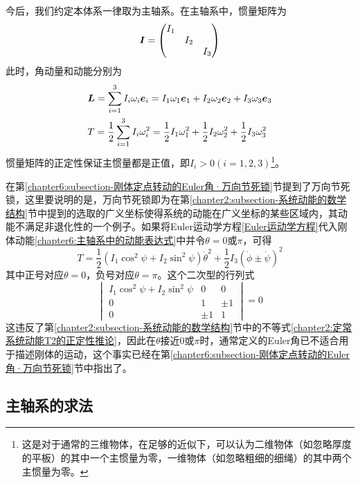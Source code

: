 今后，我们约定本体系一律取为主轴系。在主轴系中，惯量矩阵为
\begin{equation*}
	\boldsymbol{I} = \begin{pmatrix} I_1 & & \\ & I_2 & \\ & & I_3 \end{pmatrix}
\end{equation*}
此时，角动量和动能分别为
\begin{align}
	& \boldsymbol{L} = \sum_{i=1}^3 I_i \omega_i \boldsymbol{e}_i = I_1\omega_1\boldsymbol{e}_1+I_2\omega_2\boldsymbol{e}_2+I_3\omega_3\boldsymbol{e}_3 \label{chapter6:主轴系中的角动量表达式} \\
	& T = \frac12 \sum_{i=1}^3 I_i \omega_i^2 = \frac12 I_1\omega_1^2+\frac12 I_2\omega_2^2+\frac12 I_3\omega_3^2 \label{chapter6:主轴系中的动能表达式}
\end{align}
惯量矩阵的正定性保证主惯量都是正值，即$I_i>0(i=1,2,3)$\footnote{这是对于通常的三维物体，在足够的近似下，可以认为二维物体（如忽略厚度的平板）的其中一个主惯量为零，一维物体（如忽略粗细的细绳）的其中两个主惯量为零。}。

在第\ref{chapter6:subsection-刚体定点转动的Euler角·万向节死锁}节提到了万向节死锁，这里要说明的是，万向节死锁即为在第\ref{chapter2:subsection-系统动能的数学结构}节中提到的选取的广义坐标使得系统的动能在广义坐标的某些区域内，其动能不满足非退化性的一个例子。如果将Euler运动学方程\eqref{Euler运动学方程}代入刚体动能\eqref{chapter6:主轴系中的动能表达式}中并令$\theta=0\text{或}\pi$，可得
\begin{equation}
	T = \frac12 (I_1\cos^2\psi+I_2\sin^2\psi)\dot{\theta}^2 + \frac12 I_3(\dot{\phi}\pm \dot{\psi})^2
\end{equation}
其中正号对应$\theta=0$，负号对应$\theta=\pi$。这个二次型的行列式
\begin{equation*}
	\begin{vmatrix}
		I_1\cos^2\psi+I_2\sin^2\psi & 0 & 0 \\
		0 & 1 & \pm 1 \\
		0 & \pm 1 & 1 
	\end{vmatrix} = 0
\end{equation*}
这违反了第\ref{chapter2:subsection-系统动能的数学结构}节中的不等式\eqref{chapter2:定常系统动能T2的正定性推论}，因此在$\theta$接近$0$或$\pi$时，通常定义的Euler角已不适合用于描述刚体的运动，这个事实已经在第\ref{chapter6:subsection-刚体定点转动的Euler角·万向节死锁}节中指出了。

\subsection{主轴系的求法}

